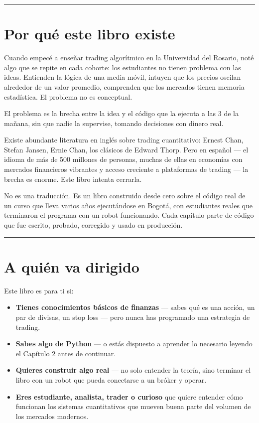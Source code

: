\documentclass[12pt, a4paper, twoside, openright]{book}
\providecommand{\tightlist}{%
  \setlength{\itemsep}{2pt}\setlength{\parskip}{0pt}}
\numberwithin{figure}{chapter}
\numberwithin{table}{chapter}
\begin{document}
\begin{center}\rule{0.5\linewidth}{0.5pt}\end{center}

\section{Por qué este libro existe}\label{por-quuxe9-este-libro-existe}

Cuando empecé a enseñar trading algorítmico en la Universidad del
Rosario, noté algo que se repite en cada cohorte: los estudiantes no
tienen problema con las ideas. Entienden la lógica de una media móvil,
intuyen que los precios oscilan alrededor de un valor promedio,
comprenden que los mercados tienen memoria estadística. El problema no
es conceptual.

El problema es la brecha entre la idea y el código que la ejecuta a las
3 de la mañana, sin que nadie la supervise, tomando decisiones con
dinero real.

Existe abundante literatura en inglés sobre trading cuantitativo: Ernest
Chan, Stefan Jansen, Ernie Chan, los clásicos de Edward Thorp. Pero en
español --- el idioma de más de 500 millones de personas, muchas de
ellas en economías con mercados financieros vibrantes y acceso creciente
a plataformas de trading --- la brecha es enorme. Este libro intenta
cerrarla.

No es una traducción. Es un libro construido desde cero sobre el código
real de un curso que lleva varios años ejecutándose en Bogotá, con
estudiantes reales que terminaron el programa con un robot funcionando.
Cada capítulo parte de código que fue escrito, probado, corregido y
usado en producción.

\begin{center}\rule{0.5\linewidth}{0.5pt}\end{center}

\section{A quién va dirigido}\label{a-quiuxe9n-va-dirigido}

Este libro es para ti si:

\begin{itemize}
\tightlist
\item
  \textbf{Tienes conocimientos básicos de finanzas} --- sabes qué es una
  acción, un par de divisas, un stop loss --- pero nunca has programado
  una estrategia de trading.
\item
  \textbf{Sabes algo de Python} --- o estás dispuesto a aprender lo
  necesario leyendo el Capítulo 2 antes de continuar.
\item
  \textbf{Quieres construir algo real} --- no solo entender la teoría,
  sino terminar el libro con un robot que pueda conectarse a un bróker y
  operar.
\item
  \textbf{Eres estudiante, analista, trader o curioso} que quiere
  entender cómo funcionan los sistemas cuantitativos que mueven buena
  parte del volumen de los mercados modernos.
\end{itemize}
\end{document}
